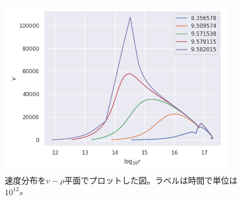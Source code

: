 \documentclass[a4j, dvipdfmx]{jsarticle}
\begin{document}
\begin{figure}[H]
    \includegraphics[clip,width=10.0cm]{graph/v_r_noion.png}
    \caption{速度分布を$v-\rho$平面でプロットした図。ラベルは時間で単位は$10^{12}s$}
    \label{fig:v_r_noion}
\end{figure}
\end{document}

